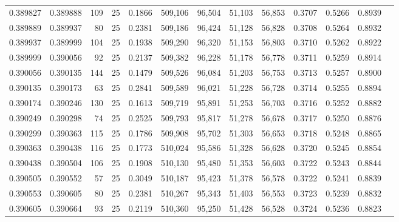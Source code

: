 \begin{tabular}{rrrrrrrrrrrrr}
0.389827 & 0.389888 &   109 &  25 &                                     0.1866 & 509,106 &  96,504 &  51,103 &  56,853 & 0.3707 & 0.5266 & 0.8939 \\
0.389889 & 0.389937 &    80 &  25 &                                     0.2381 & 509,186 &  96,424 &  51,128 &  56,828 & 0.3708 & 0.5264 & 0.8932 \\
0.389937 & 0.389999 &   104 &  25 &                                     0.1938 & 509,290 &  96,320 &  51,153 &  56,803 & 0.3710 & 0.5262 & 0.8922 \\
0.389999 & 0.390056 &    92 &  25 &                                     0.2137 & 509,382 &  96,228 &  51,178 &  56,778 & 0.3711 & 0.5259 & 0.8914 \\
0.390056 & 0.390135 &   144 &  25 &                                     0.1479 & 509,526 &  96,084 &  51,203 &  56,753 & 0.3713 & 0.5257 & 0.8900 \\
0.390135 & 0.390173 &    63 &  25 &                                     0.2841 & 509,589 &  96,021 &  51,228 &  56,728 & 0.3714 & 0.5255 & 0.8894 \\
0.390174 & 0.390246 &   130 &  25 &                                     0.1613 & 509,719 &  95,891 &  51,253 &  56,703 & 0.3716 & 0.5252 & 0.8882 \\
0.390249 & 0.390298 &    74 &  25 &                                     0.2525 & 509,793 &  95,817 &  51,278 &  56,678 & 0.3717 & 0.5250 & 0.8876 \\
0.390299 & 0.390363 &   115 &  25 &                                     0.1786 & 509,908 &  95,702 &  51,303 &  56,653 & 0.3718 & 0.5248 & 0.8865 \\
0.390363 & 0.390438 &   116 &  25 &                                     0.1773 & 510,024 &  95,586 &  51,328 &  56,628 & 0.3720 & 0.5245 & 0.8854 \\
0.390438 & 0.390504 &   106 &  25 &                                     0.1908 & 510,130 &  95,480 &  51,353 &  56,603 & 0.3722 & 0.5243 & 0.8844 \\
0.390505 & 0.390552 &    57 &  25 &                                     0.3049 & 510,187 &  95,423 &  51,378 &  56,578 & 0.3722 & 0.5241 & 0.8839 \\
0.390553 & 0.390605 &    80 &  25 &                                     0.2381 & 510,267 &  95,343 &  51,403 &  56,553 & 0.3723 & 0.5239 & 0.8832 \\
0.390605 & 0.390664 &    93 &  25 &                                     0.2119 & 510,360 &  95,250 &  51,428 &  56,528 & 0.3724 & 0.5236 & 0.8823 \\

\end{tabular}

